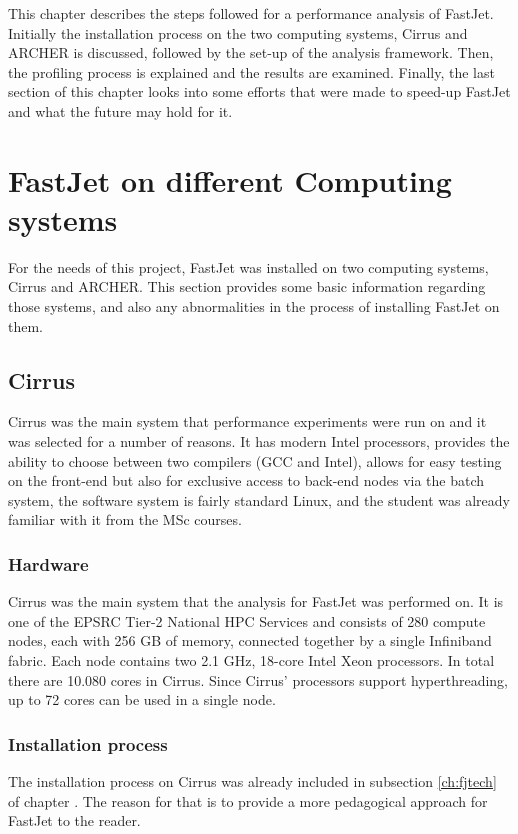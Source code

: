 This chapter describes the steps followed for a performance analysis of FastJet. Initially the installation process on the two computing systems, Cirrus and ARCHER is discussed, followed by the set-up of the analysis framework. Then, the profiling process is explained and the results are examined. Finally, the last section of this chapter looks into some efforts that were made to speed-up FastJet and what the future may hold for it.

\section{FastJet on different Computing systems}
For the needs of this project, FastJet was installed on two computing systems, Cirrus and ARCHER. This section provides some basic information regarding those systems, and also any abnormalities in the process of installing FastJet on them.
\subsection{Cirrus}\label{ch:cirrus}
Cirrus was the main system that performance experiments were run on and it was selected for a number of reasons. It has modern Intel processors, provides the ability to choose between two compilers (GCC and Intel), allows for easy testing on the front-end but also for exclusive access to back-end nodes via the batch system, the software system is fairly standard Linux, and the student was already familiar with it from the MSc courses. 

\subsubsection{Hardware}
Cirrus\cite{cirrus} was the main system that the analysis for FastJet was performed on. It is one of the EPSRC Tier-2 National HPC Services and consists of 280 compute nodes, each with 256 GB of memory, connected together by a single Infiniband fabric. Each node contains two 2.1 GHz, 18-core Intel Xeon processors. In total there are 10.080 cores in Cirrus. Since Cirrus' processors support hyperthreading, up to 72 cores can be used in a single node.
\subsubsection{Installation process}
The installation process on Cirrus was already included in subsection \ref{ch:fjtech} of chapter . The reason for that is to provide a more pedagogical approach for FastJet to the reader. 

